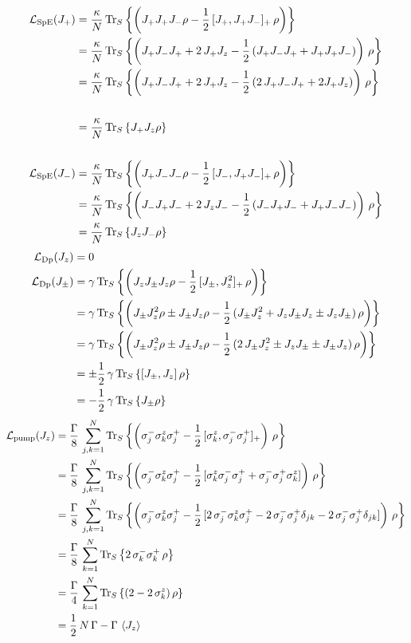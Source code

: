     \begin{align*}
        \mathcal{L}_\text{SpE}(J_+)&=\frac{\kappa}{N}\,\text{Tr}_S\left\{\left(J_+ J_+ J_- \rho-\frac{1}{2}\,[J_+,J_+ J_-]_+\,\rho\right)\right\}\\
        &=\frac{\kappa}{N}\,\text{Tr}_S\left\{\left(J_+ J_- J_+ + 2\,J_+ J_z -\frac{1}{2}\,(J_+ J_- J_+ + J_+ J_+ J_-)\right)\,\rho\right\}\\ &=\frac{\kappa}{N}\,\text{Tr}_S\left\{\left(J_+ J_- J_+ + 2\,J_+ J_z -\frac{1}{2}\,(2\,J_+ J_- J_+ + 2 J_+ J_z)\right)\,\rho\right\}\\\\
        &=\frac{\kappa}{N}\,\text{Tr}_S\left\{J_+ J_z \rho\right\}\\\\
        \mathcal{L}_\text{SpE}(J_-)&=\frac{\kappa}{N}\,\text{Tr}_S\left\{\left(J_+ J_- J_- \rho-\frac{1}{2}\,[J_-,J_+ J_-]_+\,\rho\right)\right\}\\
        &=\frac{\kappa}{N}\,\text{Tr}_S\left\{\left(J_- J_+ J_- + 2\,J_z J_- -\frac{1}{2}\,(J_- J_+ J_- + J_+ J_- J_-)\right)\,\rho\right\}\\ 
        &=\frac{\kappa}{N}\,\text{Tr}_S\left\{J_z J_- \rho\right\}
    \end{align*}
    \begin{align*}
        \mathcal{L}_\text{Dp}(J_z)&=0\\
        \mathcal{L}_\text{Dp}(J_\pm)&=\gamma\,\text{Tr}_S\left\{\left(J_z J_\pm J_z \rho-\frac{1}{2}\,[J_\pm,J_z^2]_+\,\rho\right)\right\}\\
        &=\gamma\,\text{Tr}_S\left\{\left(J_\pm J_z^2\rho \pm J_\pm J_z \rho-\frac{1}{2}\,(J_\pm J_z^2 + J_z J_\pm J_z \pm J_z J_\pm)\,\rho\right)\right\}\\
        &=\gamma\,\text{Tr}_S\left\{\left(J_\pm J_z^2\rho \pm J_\pm J_z \rho-\frac{1}{2}\,(2\,J_\pm J_z^2  \pm J_z J_\pm \pm J_\pm J_z)\,\rho\right)\right\}\\
        &=\pm\frac{1}{2}\, \gamma\,\text{Tr}_S\left\{[J_\pm,J_z]\,\rho\right\}\\
        &=-\frac{1}{2}\,\gamma\,\text{Tr}_S\left\{J_\pm\rho\right\}
    \end{align*}
    \begin{align*}
        \mathcal{L}_\text{pump}(J_z)&=\frac{\Gamma}{8}\,\sum_{j,k=1}^N \text{Tr}_S\left\{\left( \sigma_j^- \sigma_k^z \sigma_j^+ -\frac{1}{2}\,[\sigma_k^z,\sigma_j^-\sigma_j^+]_+   \right)\,\rho\right\}\\
        &=\frac{\Gamma}{8}\,\sum_{j,k=1}^N \text{Tr}_S\left\{\left( \sigma_j^- \sigma_k^z \sigma_j^+ -\frac{1}{2}\,[\sigma_k^z\sigma_j^-\sigma_j^++\sigma_j^-\sigma_j^+\sigma_k^z]   \right)\,\rho\right\}\\
        &=\frac{\Gamma}{8}\,\sum_{j,k=1}^N \text{Tr}_S\left\{\left( \sigma_j^- \sigma_k^z \sigma_j^+ -\frac{1}{2}\,[2\,\sigma_j^-\sigma_k^z\sigma_j^+  -2\, \sigma_j^-\sigma_j^+\delta_{jk}-2\, \sigma_j^-\sigma_j^+\delta_{jk}]   \right)\,\rho\right\}\\
        &=\frac{\Gamma}{8}\,\sum_{k=1}^N \text{Tr}_S\left\{2\, \sigma_k^-\sigma_k^+  \,\rho\right\}\\
        &=\frac{\Gamma}{4}\,\sum_{k=1}^N \text{Tr}_S\left\{ (2-2\,\sigma_k^z)  \,\rho\right\}\\
        &=\frac{1}{2}\,N\,\Gamma-\Gamma\,\braket{J_z}
    \end{align*}
